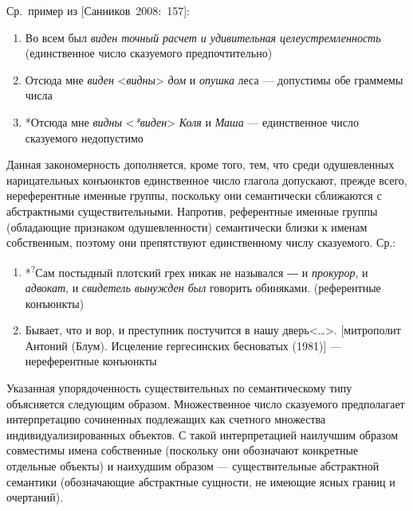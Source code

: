 Ср.~пример из {[}Санников~2008:~157{]}:

\begin{enumerate}
  \def\labelenumi{(\arabic{enumi})}
  \setcounter{enumi}{117}
  \item
        Во всем был \textit{виден точный расчет и удивительная
          целеустремленность} (единственное число сказуемого предпочтительно)
  \item
        Отсюда мне \textit{виден} \textless{}\textit{видны}\textgreater{}
        \textit{дом} и \textit{опушка} леса --- допустимы обе граммемы числа
  \item
        *Отсюда мне \textit{видны} \textless{}\textit{*виден}\textgreater{}
        \textit{Коля} и \textit{Маша} --- единственное число сказуемого недопустимо
\end{enumerate}

Данная закономерность дополняется, кроме того, тем, что среди
одушевленных нарицательных конъюнктов единственное число глагола
допускают, прежде всего, нереферентные именные группы, поскольку они
семантически сближаются с абстрактными существительными. Напротив,
референтные именные группы (обладающие признаком одушевленности)
семантически близки к именам собственным, поэтому они препятствуют
единственному числу сказуемого. Ср.:

\begin{enumerate}
  \def\labelenumi{(\arabic{enumi})}
  \setcounter{enumi}{120}
  \item
        *\textsuperscript{?}Сам постыдный плотский грех никак не назывался ― и
        \textit{прокурор}, и \textit{адвокат}, и \textit{свидетель вынужден был}
        говорить обиняками. (референтные конъюнкты)
  \item
        Бывает, что и вор, и преступник постучится в нашу
        дверь\textless\ldots\textgreater. {[}митрополит Антоний (Блум).
        Исцеление гергесинских бесноватых (1981){]} --- нереферентные конъюнкты
\end{enumerate}

Указанная упорядоченность существительных по семантическому типу
объясняется следующим образом. Множественное число сказуемого
предполагает интерпретацию сочиненных подлежащих как счетного множества
индивидуализированных объектов. С такой интерпретацией наилучшим образом
совместимы имена собственные (поскольку они обозначают конкретные
отдельные объекты) и наихудшим образом --- существительные абстрактной
семантики (обозначающие абстрактные сущности, не имеющие ясных границ и
очертаний).

